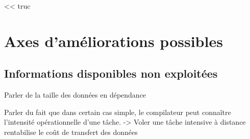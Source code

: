 \begin{savequote}[6cm]
<< truc
\end{savequote}

\chapter{Axes d'améliorations possibles}\label{chap:perspectives}
\chaptertoc

\section{Informations disponibles non exploitées}


Parler de la taille des données en dépendance

Parler du fait que dans certain cas simple, le compilateur peut connaître l'intensité opérationnelle d'une tâche.
-> Voler une tâche intensive à distance rentabilise le coût de transfert des données

%

